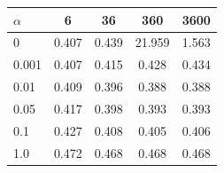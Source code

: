 \begin{tabular}{l c c c c}
\toprule
$\alpha$ & 6 & 36 & 360 & 3600 \\
\midrule
0 & 0.407 & 0.439 & 21.959 & 1.563 \\
0.001 & 0.407 & 0.415 & 0.428 & 0.434 \\
0.01 & 0.409 & 0.396 & 0.388 & 0.388 \\
0.05 & 0.417 & 0.398 & 0.393 & 0.393 \\
0.1 & 0.427 & 0.408 & 0.405 & 0.406 \\
1.0 & 0.472 & 0.468 & 0.468 & 0.468 \\
\bottomrule
\end{tabular}